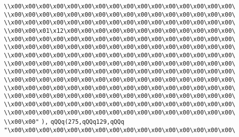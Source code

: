 \verb|\\x00\x00\x00\x00\x00\x00\x00\x00\x00\x00\x00\x00\x00\x00\x00\x00\|\newline
\verb|\\x00\x00\x00\x00\x00\x00\x00\x00\x00\x00\x00\x00\x00\x00\x00\x00\|\newline
\verb|\\x00\x00\x00\x00\x00\x00\x00\x00\x00\x00\x00\x00\x00\x00\x00\x00\|\newline
\verb|\\x00\x00\x01\x12\x00\x00\x00\x00\x00\x00\x00\x00\x00\x00\x00\x00\|\newline
\verb|\\x00\x00\x00\x00\x00\x00\x00\x00\x00\x00\x00\x00\x00\x00\x00\x00\|\newline
\verb|\\x00\x00\x00\x00\x00\x00\x00\x00\x00\x00\x00\x00\x00\x00\x00\x00\|\newline
\verb|\\x00\x00\x00\x00\x00\x00\x00\x00\x00\x00\x00\x00\x00\x00\x00\x00\|\newline
\verb|\\x00\x00\x00\x00\x00\x00\x00\x00\x00\x00\x00\x00\x00\x00\x00\x00\|\newline
\verb|\\x00\x00\x00\x00\x00\x00\x00\x00\x00\x00\x00\x00\x00\x00\x00\x00\|\newline
\verb|\\x00\x00\x00\x00\x00\x00\x00\x00\x00\x00\x00\x00\x00\x00\x00\x00\|\newline
\verb|\\x00\x00\x00\x00\x00\x00\x00\x00\x00\x00\x00\x00\x00\x00\x00\x00\|\newline
\verb|\\x00\x00\x00\x00\x00\x00\x00\x00\x00\x00\x00\x00\x00\x00\x00\x00\|\newline
\verb|\\x00\x00\x00\x00\x00\x00\x00\x00\x00\x00\x00\x00\x00\x00\x00\x00\|\newline
\verb|\\x00\x00\x00\x00\x00\x00\x00\x00\x00\x00\x00\x00\x00\x00\x00\x00\|\newline
\verb|\\x00\x00"|\newline
\verb|),|\newline
\verb|qQQq(275,qQQq129,qQQq|\newline
\verb|"\x00\x00\x00\x00\x00\x00\x00\x00\x00\x00\x00\x00\x00\x00\x00\x00\|\newline
